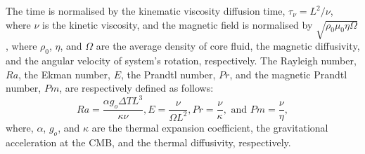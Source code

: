 The time is normalised by the kinematic viscosity diffusion time, $\tau_{\nu}  = L^{2} / \nu$, where $\nu$ is the kinetic viscosity, and the magnetic field is normalised by $\sqrt{\rho_{0} \mu_{0} \eta \Omega}$, where $\rho_{0}$, $\eta$, and $\Omega$ are the average density of core fluid, the magnetic diffusivity, and the angular velocity of system's rotation, respectively.
The Rayleigh number, $Ra$, the Ekman number, $E$, the Prandtl number, $Pr$, and the magnetic Prandtl number, $Pm$, are respectively defined as follows:
%
\begin{equation}
Ra = \displaystyle{ \frac{\alpha g_o \Delta T L^{3}}{ \kappa \nu} }, 
E  = \displaystyle{ \frac{\nu}{\Omega L^{2}} },
Pr = \displaystyle{ \frac{\nu}{\kappa} }, 
\mbox{ and }
Pm = \displaystyle{ \frac{\nu}{\eta} },
\label{eq:dimensionless}
\end{equation}
%
where, $\alpha$, $g_o$, and $\kappa$ are the thermal expansion coefficient, the gravitational acceleration at the CMB, and the thermal diffusivity, respectively.


